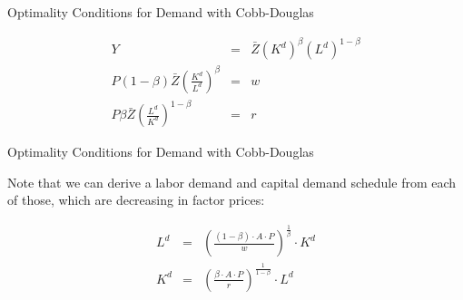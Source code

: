 \documentclass[notes,11pt, aspectratio=169, xcolor=table]{beamer}
\begin{document}
\begin{frame}{Optimality Conditions for Demand with Cobb-Douglas}

  \begin{eqnarray*}
    Y &=& \bar{Z} (K^d)^{\beta} (L^d)^{1-\beta} \\
    P (1-\beta) \bar{Z} \left( \frac{K^d}{L^d} \right)^\beta  &=& w \\
    P \beta \bar{Z} \left( \frac{L^d}{K^d} \right)^{1-\beta}  &=& r 
  \end{eqnarray*}

\end{frame}

\begin{frame}{Optimality Conditions for Demand with Cobb-Douglas}

  Note that we can derive a labor demand and capital demand schedule from each of those, which are decreasing in factor prices:

  \begin{eqnarray*}
    L^d &=& \left( \frac{(1-\beta) \cdot A \cdot P}{w} \right)^{\frac{1}{\beta}} \cdot K^d \\
    K^d &=& \left( \frac{\beta \cdot A \cdot P}{r} \right)^{\frac{1}{1-\beta}} \cdot L^d
  \end{eqnarray*}

\end{frame}
\end{document}
